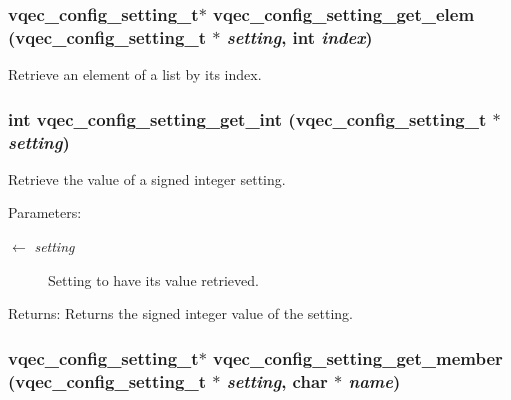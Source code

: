 \subsubsection{\setlength{\rightskip}{0pt plus 5cm}\bf{vqec\_\-config\_\-setting\_\-t}$\ast$ vqec\_\-config\_\-setting\_\-get\_\-elem (\bf{vqec\_\-config\_\-setting\_\-t} $\ast$ {\em setting}, int {\em index})}\label{vqec__config__parser_8h_4fcdc34e151d833e48c551d02d0ca51c}


Retrieve an element of a list by its index. 
\subsubsection{\setlength{\rightskip}{0pt plus 5cm}int vqec\_\-config\_\-setting\_\-get\_\-int (\bf{vqec\_\-config\_\-setting\_\-t} $\ast$ {\em setting})}\label{vqec__config__parser_8h_e5f8a085569a7a8e75efcef0e4bc98ac}


Retrieve the value of a signed integer setting.

\begin{Desc}
\item[Parameters:]
\begin{description}
\item[\mbox{$\leftarrow$} {\em setting}]Setting to have its value retrieved. \end{description}
\end{Desc}
\begin{Desc}
\item[Returns:]Returns the signed integer value of the setting. \end{Desc}
\subsubsection{\setlength{\rightskip}{0pt plus 5cm}\bf{vqec\_\-config\_\-setting\_\-t}$\ast$ vqec\_\-config\_\-setting\_\-get\_\-member (\bf{vqec\_\-config\_\-setting\_\-t} $\ast$ {\em setting}, char $\ast$ {\em name})}\label{vqec__config__parser_8h_27730b04cc0a10473d7d134a0472cca4}



